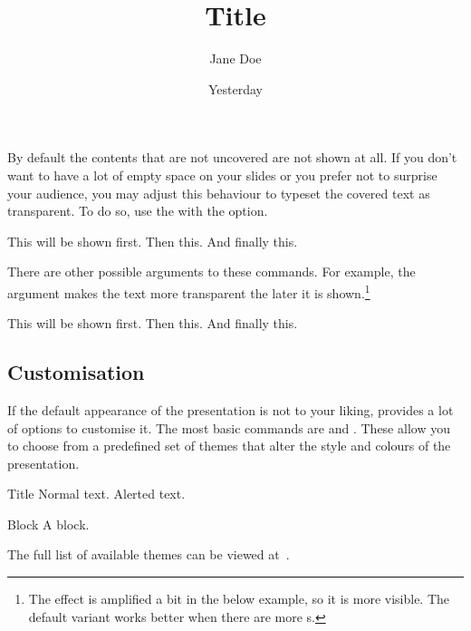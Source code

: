 By default the contents that are not uncovered are not shown at all. If you
don't want to have a lot of empty space on your slides or you prefer not to
surprise your audience, you may adjust this behaviour to typeset the covered
text as transparent. To do so, use the  with the
 option.
\begin{example}[
  vertical_mode,
  to_page=3,
  paperheight=2.8cm,
  paperwidth=3.7cm,
  examplewidth=.95\linewidth,
]

\begin{frame}
  This will be shown first. \pause Then this. \pause
  And finally this.
\end{frame}
\end{example}
There are other possible arguments to these commands. For example, the
 argument makes the text more transparent the later it is
shown.\footnote{The effect is amplified a bit in the below example, so it is
  more visible. The default variant works better when there are more
  s.}
\begin{example}[
  vertical_mode,
  to_page=3,
  paperheight=2.8cm,
  paperwidth=3.7cm,
  examplewidth=.95\linewidth,
]

\begin{frame}
  This will be shown first. \pause Then this. \pause
  And finally this.
\end{frame}
\end{example}

\subsection{Customisation}

If the default appearance of the presentation is not to your liking,
 provides a lot of options to customise it. The most basic commands
are  and . These allow you to choose from a
predefined set of themes that alter the style and colours of the presentation.

\begin{example}
\author{Jane Doe}
\title{Title}
\date{Yesterday}

\begin{frame}{Title}
  Normal text.
  \alert{Alerted text}.
  \begin{block}{Block}
    A block.
  \end{block}
\end{frame}
\end{example}
The full list of available themes can be viewed
at~\cite{AnotherBeamerThemeMatrix}.

